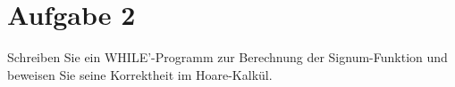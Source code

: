 \documentclass[ngerman,a4paper]{report}
\begin{document}
\section*{Aufgabe 2}
Schreiben Sie ein WHILE'-Programm zur Berechnung der Signum-Funktion und beweisen Sie seine Korrektheit im Hoare-Kalkül.\\
\end{document}
